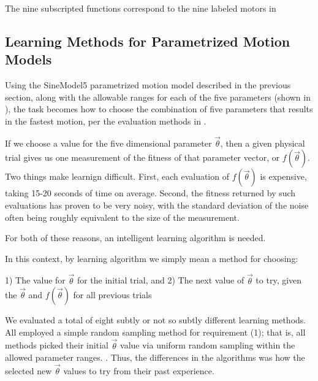 The nine subscripted functions correspond to the nine labeled motors in 






\subsection{Learning Methods for Parametrized Motion Models}

Using the SineModel5 parametrized motion model described in the previous section, along with the allowable ranges for each of the five parameters (shown in ), the task becomes how to choose the combination of five parameters that results in the fastest motion, per the evaluation methods in .

If we choose a value for the five dimensional parameter $\vec{\theta}$, then a given physical trial gives us one measurement of the fitness of that parameter vector, or $f(\vec{\theta})$.  Two things make learnign difficult.  First, each evaluation of $f(\vec{\theta})$ is expensive, taking 15-20 seconds of time on average.  Second, the fitness returned by such evaluations has proven to be very noisy, with the standard deviation of the noise often being roughly equivalent to the size of the measurement.

For both of these reasons, an intelligent learning algorithm is needed.

In this context, by learning algorithm we simply mean a method for choosing:

1) The value for $\vec{\theta}$ for the initial trial, and
2) The next value of $\vec{\theta}$ to try, given the $\vec{\theta}$ and $f(\vec{\theta})$ for all previous trials

We evaluated a total of eight subtly or not so subtly different learning methods.  All employed a simple random sampling method for requirement (1); that is, all methods picked their initial $\vec{\theta}$ value via uniform random sampling within the allowed parameter ranges. .  Thus, the differences in the algorithms was how the selected new $\vec{\theta}$ values to try from their past experience.

